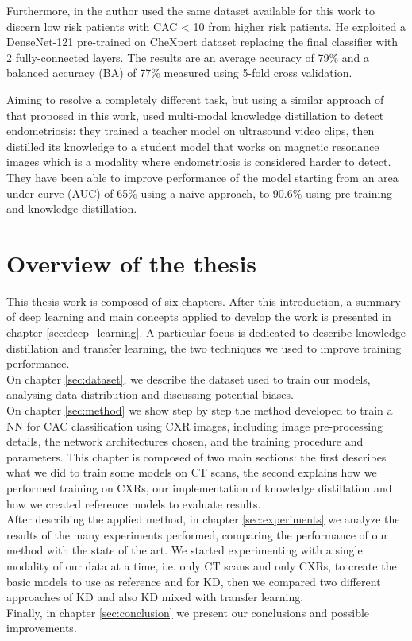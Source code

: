 Furthermore, in \cite{iodice_2022} the author used the same dataset available for this work to discern low risk patients with CAC < 10 from higher risk patients.
He exploited a DenseNet-121 \cite{huang2018densely} pre-trained on CheXpert dataset \cite{Irvin_2019} replacing the final classifier with 2 fully-connected layers.
The results are an average accuracy of 79\% and a balanced accuracy (BA) of 77\% measured using 5-fold cross validation.

Aiming to resolve a completely different task, but using a similar approach of that proposed in this work, \citeauthor{zhang2023distilling} \cite{zhang2023distilling} used multi-modal knowledge distillation to detect endometriosis: they trained a teacher model on ultrasound video clips, then distilled its knowledge to a student model that works on magnetic resonance images which is a modality where endometriosis is considered harder to detect.
They have been able to improve performance of the model starting from an area under curve (AUC) of 65\% using a naive approach, to 90.6\% using pre-training and knowledge distillation.


\section{Overview of the thesis}
This thesis work is composed of six chapters.
After this introduction, a summary of deep learning and main concepts applied to develop the work is presented in chapter \ref{sec:deep_learning}.
A particular focus is dedicated to describe knowledge distillation and transfer learning, the two techniques we used to improve training performance.
\\
On chapter \ref{sec:dataset}, we describe the dataset used to train our models, analysing data distribution and discussing potential biases.
\\
On chapter \ref{sec:method} we show step by step the method developed to train a NN for CAC classification using CXR images, including image pre-processing details, the network architectures chosen, and the training procedure and parameters.
This chapter is composed of two main sections: the first describes what we did to train some models on CT scans, the second explains how we performed training on CXRs, our implementation of knowledge distillation and how we created reference models to evaluate results.
\\
After describing the applied method, in chapter \ref{sec:experiments} we analyze the results of the many experiments performed, comparing the performance of our method with the state of the art.
We started experimenting with a single modality of our data at a time, i.e. only CT scans and only CXRs, to create the basic models to use as reference and for KD, then we compared two different approaches of KD and also KD mixed with transfer learning.
\\
Finally, in chapter \ref{sec:conclusion} we present our conclusions and possible improvements.
